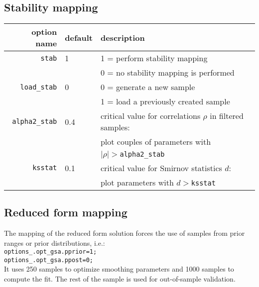 \documentclass[12pt,a4paper]{article}
\begin{document}
\subsection{Stability mapping}
\begin{tabular}{r|l|l}
                option name & default & description  \\ \hline
                 \verb"stab"& 1& 1 = perform stability mapping \\
                            &  & 0 = no stability mapping is performed\\
            \verb"load_stab"& 0& 0 =  generate a new sample\\
                            &  & 1 = load a previously created sample \\
          \verb"alpha2_stab"& 0.4& critical value for correlations $\rho$ in filtered samples:\\
                            &    & plot couples of parameters with \\
                            &   & $|\rho|>$\verb"alpha2_stab"\\
               \verb"ksstat"& 0.1& critical value for Smirnov statistics $d$: \\
                            &   & plot parameters with $d>$\verb"ksstat"\\ \hline
\end{tabular}

\newpage
\subsection{Reduced form mapping}%
The mapping of the reduced form solution forces the use of samples
from prior ranges or prior distributions, i.e.:
\\
\verb"options_.opt_gsa.pprior=1;"\\
\verb"options_.opt_gsa.ppost=0;"\\

It uses 250 samples to optimize smoothing parameters and 1000
samples to compute the fit. The rest of the sample is used  for
out-of-sample validation. \vspace{0.5cm}
\end{document}
